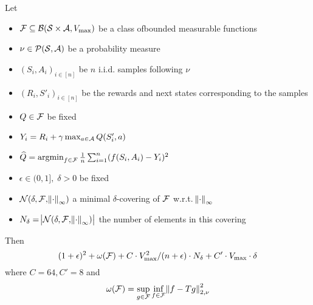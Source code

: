 
\begin{thm}\label{thm:oneStep}
  Let
  \begin{itemize}
    \item $\mathcal{F} \subseteq \mathcal{B}(\mathcal{S}\times\mathcal{A}, V_{\max})$
      be a class ofbounded measurable functions
    \item $\nu \in \mathcal{P}(\mathcal{S},\mathcal{A})$ be a probability measure
    \item $(S_i, A_i)_{i\in[n]}$ be $n$ i.i.d. samples following $\nu$
    \item $(R_i, S'_i)_{i\in[n]}$ be the rewards and next states
    	corresponding to the samples
    \item $Q \in \mathcal{F}$ be fixed
    \item $Y_i = R_i + \gamma \max_{a \in \mathcal{A}} Q(S'_i, a)$
    \item $\widehat{Q} = \operatorname*{argmin}_{f \in \mathcal{F}} \frac{1}{n}
      \sum_{i=1}^n (f(S_i, A_i) - Y_i)^2$
    \item $\epsilon \in (0,1],\; \delta > 0$ be fixed
    \item $\mathcal{N}(\delta, \mathcal{F}, \norm{\cdot}_\infty)$
      a minimal $\delta$-covering of $\mathcal{F}$ w.r.t. $\norm{\cdot}_\infty$
    \item $N_\delta = \abs{\mathcal{N}(\delta, \mathcal{F}, \norm{\cdot}_\infty)}$
      the number of elements in this covering
  \end{itemize}
  Then
  \[(1+\epsilon)^2+\omega(\mathcal{F})+C\cdot V_{\max}^2/(n+\epsilon)\cdot N_\delta
  + C' \cdot V_{\max} \cdot \delta \]
  where $C = 64, C'=8$ and
  \[ \omega(\mathcal{F})
  = \sup_{g\in \mathcal{F}} \inf_{f \in \mathcal{F}} \norm{f - T g}_{2, \nu}^2 \]
\end{thm}
